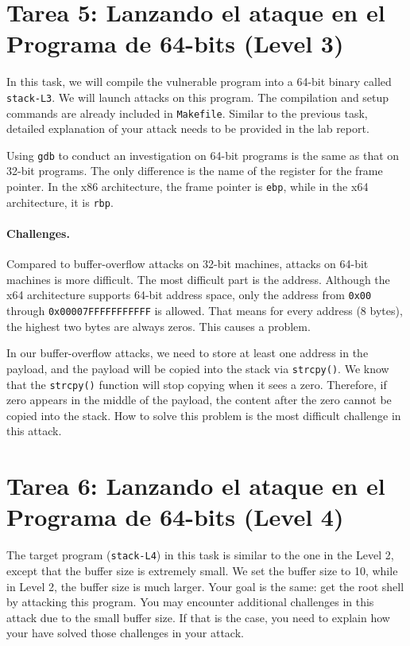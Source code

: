 \section{Tarea 5: Lanzando el ataque en el Programa de 64-bits (Level 3)}

In this task, we will compile the vulnerable program 
into a 64-bit binary called \texttt{stack-L3}.  
We will launch attacks on this program. The compilation and setup
commands are already included in \texttt{Makefile}. Similar to
the previous task, detailed explanation of your attack needs to be provided 
in the lab report. 


Using \texttt{gdb} to conduct an investigation on 64-bit programs 
is the same as that on 32-bit programs.
The only difference is the name of the register for the frame pointer.
In the x86 architecture,
the frame pointer is \texttt{ebp}, while in the x64 architecture,
it is \texttt{rbp}. 


\paragraph{Challenges.} Compared to buffer-overflow attacks on 32-bit
machines, attacks on 64-bit machines is more difficult. The most
difficult part is the address. Although the x64 architecture
supports 64-bit address space, only the address from
\texttt{0x00} through \texttt{0x00007FFFFFFFFFFF} is allowed. That means for
every address (8 bytes), the highest two bytes are always zeros.
This causes a problem.

In our buffer-overflow attacks, we need to store at least one address
in the payload, and the payload will be copied into the stack via
\texttt{strcpy()}. We know that the \texttt{strcpy()} function
will stop copying when it sees a zero. Therefore, if zero
appears in the middle of the payload, the content after the
zero cannot be copied into the stack. How to solve this
problem is the most difficult challenge in this attack.




\section{Tarea 6: Lanzando el ataque en el Programa de 64-bits (Level 4)}


The target program (\texttt{stack-L4}) in this task is similar to the one in the Level 2,
except that the buffer size is extremely small. We set the 
buffer size to 10, while in Level 2, the buffer size is much larger. 
Your goal is the same: get the root shell by attacking this \setuid program. 
You may encounter additional challenges in this attack 
due to the small buffer size. 
If that is the case, you need to explain how your have solved 
those challenges in your attack. 



